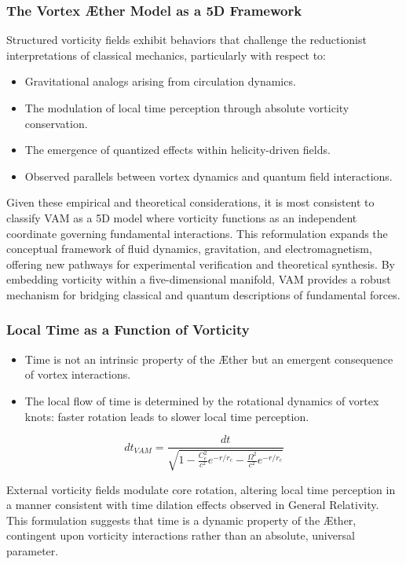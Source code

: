 \subsubsection*{The Vortex Æther Model as a 5D Framework}
Structured vorticity fields exhibit behaviors that challenge the reductionist interpretations of classical mechanics, particularly with respect to:

\begin{itemize}
    \item Gravitational analogs arising from circulation dynamics.
    \item The modulation of local time perception through absolute vorticity conservation.
    \item The emergence of quantized effects within helicity-driven fields.
    \item Observed parallels between vortex dynamics and quantum field interactions.
\end{itemize}

Given these empirical and theoretical considerations, it is most consistent to classify VAM as a 5D model where vorticity functions as an independent coordinate governing fundamental interactions.
This reformulation expands the conceptual framework of fluid dynamics, gravitation, and electromagnetism, offering new pathways for experimental verification and theoretical synthesis.
By embedding vorticity within a five-dimensional manifold, VAM provides a robust mechanism for bridging classical and quantum descriptions of fundamental forces.


\subsubsection*{Local Time as a Function of Vorticity}\label{subsec:local-time-as-a-function-of-vorticity}

\begin{itemize}
    \item Time is not an intrinsic property of the Æther but an emergent consequence of vortex interactions.
    \item The local flow of time is determined by the rotational dynamics of vortex knots: faster rotation leads to slower local time perception.
\end{itemize}

\[dt_{VAM} = \frac{dt}{\sqrt{1 - \frac{C_e^2}{c^2} e^{-r/r_c} - \frac{\Omega^2}{c^2} e^{-r/r_c}}}\]

External vorticity fields modulate core rotation, altering local time perception in a manner consistent with time dilation effects observed in General Relativity.
This formulation suggests that time is a dynamic property of the \AE ther, contingent upon vorticity interactions rather than an absolute, universal parameter.

